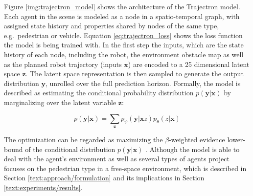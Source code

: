 Figure \ref{img:trajectron_model} shows the architecture of the Trajectron model. Each agent in the scene is modeled as a node in a spatio-temporal graph, with assigned state history and properties shared by nodes of the same type, e.g.\ pedestrian or vehicle. Equation \ref{eq:trajectron_loss} shows the loss function the model is being trained with. In the first step the inputs, which are the state history of each node, including the robot, the environment obstacle map as well as the planned robot trajectory (inputs $\boldsymbol{x}$) are encoded to a 25 dimensional latent space $\boldsymbol{z}$. The latent space representation is then sampled to generate the output distribution $\boldsymbol{y}$, unrolled over the full prediction horizon. Formally, the model is described as estimating the conditional probability distribution $p(\boldsymbol{y}|\boldsymbol{x})$ by marginalizing over the latent variable $\boldsymbol{z}$:

\begin{equation}
p(\boldsymbol{y}|\boldsymbol{x}) = \sum_{\boldsymbol{z}} p_{\psi} (\boldsymbol{y} | \boldsymbol{x} z) p_{\theta}(z | \boldsymbol{x})
\end{equation}

The optimization can be regarded as maximizing the $\beta$-weighted evidence lower-bound of the conditional distribution $p(\boldsymbol{y}|\boldsymbol{x})$ \cite{Ivanovic2018}. Although the model is able to deal with the agent's environment as well as several types of agents project \project focuses on the pedestrian type in a free-space environment, which is described in Section \ref{text:approach/formulation} and its implications in Section \ref{text:experiments/results}.

